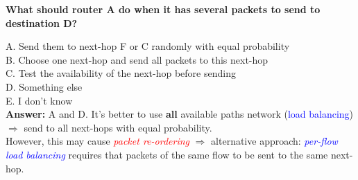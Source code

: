 \documentclass[11pt]{article}
\begin{document}
\begin{tcolorbox}[
  colback=gray!15,     %
  colframe=black!50,    %
  boxrule=1pt,       %
  arc=3mm,             %
  left=4mm, right=4mm, top=2mm, bottom=2mm %
]
\textbf{What should router A do when it has several packets to send to destination D?}

A. Send them to next-hop F or C randomly with equal probability \\
B. Choose one next-hop and send all packets to this next-hop \\
C. Test the availability of the next-hop before sending \\
D. Something else \\
E. I don't know \\

\textbf{Answer:} A and D. It's better to use \textbf{all} available paths network (\textcolor{blue}{load balancing}) $\Rightarrow$ send to all next-hops with equal probability. \\

However, this may cause \textcolor{red}{\textit{packet re-ordering}} $\Rightarrow$ alternative approach: \textcolor{blue}{\textit{per-flow load balancing}} requires that packets of the same flow to be sent to the same next-hop. 

\vspace{0.3cm}
\end{tcolorbox}
\end{document}
